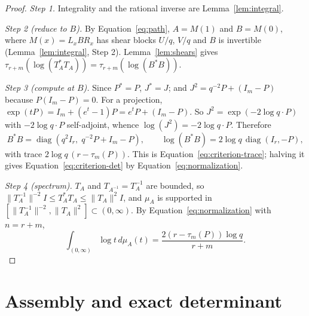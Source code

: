 \documentclass[11pt]{article}
\theoremstyle{remark}
\numberwithin{equation}{section}
\newcommand{\diag}{\operatorname{diag}}
\begin{document}
\begin{proof}
\emph{Step 1.} Integrality and the rational inverse are Lemma~\ref{lem:integral}.

\emph{Step 2 (reduce to $B$).} By Equation~\eqref{eq:path}, $A=M(1)$ and $B=M(0)$, where $M(x)=L_xBR_x$ has shear blocks $U/q$, $V/q$ and $B$ is invertible (Lemma~\ref{lem:integral}, Step 2). Lemma~\ref{lem:shears} gives
$\tau_{r+m}(\log(T_A^*T_A))=\tau_{r+m}(\log(B^*B))$.

\emph{Step 3 (compute at $B$).} Since $P^*=P$, $J^*=J$; and $J^2=q^{-2}P+(I_m-P)$ because $P(I_m-P)=0$. For a projection, $\exp(tP)=I_m+(e^t-1)P=e^tP+(I_m-P)$. So $J^2=\exp(-2\log q\cdot P)$ with $-2\log q\cdot P$ self-adjoint, whence $\log(J^2)=-2\log q\cdot P$. Therefore
\[
 B^*B=\diag(q^2I_r,\;q^{-2}P+I_m-P),\qquad
 \log(B^*B)=2\log q\,\diag(I_r,-P),
\]
with trace $2\log q\,(r-\tau_m(P))$. This is Equation~\eqref{eq:criterion-trace}; halving it gives Equation~\eqref{eq:criterion-det} by Equation~\eqref{eq:normalization}.

\emph{Step 4 (spectrum).} $T_A$ and $T_{A^{-1}}=T_A^{-1}$ are bounded, so
$\|T_A^{-1}\|^{-2}I\le T_A^*T_A\le\|T_A\|^2I$, and $\mu_A$ is supported in $[\|T_A^{-1}\|^{-2},\|T_A\|^2]\subset(0,\infty)$. By Equation~\eqref{eq:normalization} with $n=r+m$,
\begin{equation}\label{eq:criterion-integral}
 \int_{(0,\infty)}\log t\,d\mu_A(t)
 =\frac{2(r-\tau_m(P))\log q}{r+m}.
\end{equation}
\end{proof}

\section{Assembly and exact determinant}
\label{sec:assembly}
\end{document}

